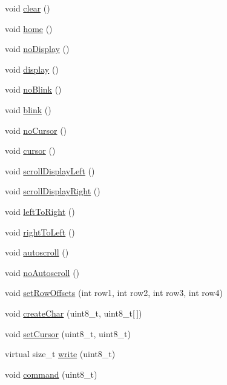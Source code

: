 \begin{DoxyCompactItemize}
\item 
void \hyperlink{class_liquid_crystal_a8c2ee5196df87db7a3541f947135df13}{clear} ()
\item 
void \hyperlink{class_liquid_crystal_aeabdf852b59e8155ef7df8db008c8d55}{home} ()
\item 
void \hyperlink{class_liquid_crystal_a85bbecc7cebc6e44972b191fbd175c23}{no\+Display} ()
\item 
void \hyperlink{class_liquid_crystal_a81bb76db1b82a8e55a07de6cb0a262b2}{display} ()
\item 
void \hyperlink{class_liquid_crystal_a05d4fa9025c421a833081090cb8039ac}{no\+Blink} ()
\item 
void \hyperlink{class_liquid_crystal_a3eadecb726b55a400f08d5e520f9cb9b}{blink} ()
\item 
void \hyperlink{class_liquid_crystal_ab2ec8e89fe805e3e0e842e53a45aaeae}{no\+Cursor} ()
\item 
void \hyperlink{class_liquid_crystal_a31f590023c937a6faabdfc50dfb18717}{cursor} ()
\item 
void \hyperlink{class_liquid_crystal_afa91cf6e72bfc07537a3ad79f4864f29}{scroll\+Display\+Left} ()
\item 
void \hyperlink{class_liquid_crystal_a271b5da2427321ae09da303b83567e90}{scroll\+Display\+Right} ()
\item 
void \hyperlink{class_liquid_crystal_ae489f88dfac1680cbe61caf355026874}{left\+To\+Right} ()
\item 
void \hyperlink{class_liquid_crystal_a19018898bae01eb687442258cc60ffc9}{right\+To\+Left} ()
\item 
void \hyperlink{class_liquid_crystal_aa5ac50d6a2053eb1c06abe62614131b4}{autoscroll} ()
\item 
void \hyperlink{class_liquid_crystal_ad4c142852e49b6fc2284a0fbc234172c}{no\+Autoscroll} ()
\item 
void \hyperlink{class_liquid_crystal_aff7f790aecc51bc80c54db12dbd38129}{set\+Row\+Offsets} (int row1, int row2, int row3, int row4)
\item 
void \hyperlink{class_liquid_crystal_adee3f44b7c819e744cc22949cf390aa6}{create\+Char} (uint8\+\_\+t, uint8\+\_\+t\mbox{[}$\,$\mbox{]})
\item 
void \hyperlink{class_liquid_crystal_a94bc7bf59c72b5d3326844cc0f1c5827}{set\+Cursor} (uint8\+\_\+t, uint8\+\_\+t)
\item 
virtual size\+\_\+t \hyperlink{class_liquid_crystal_a728e6f1ad663aaa59930f64255e30b90}{write} (uint8\+\_\+t)
\item 
void \hyperlink{class_liquid_crystal_a9aab48e57cd068d0cb63e9c4ca4c47f0}{command} (uint8\+\_\+t)
\end{DoxyCompactItemize}


